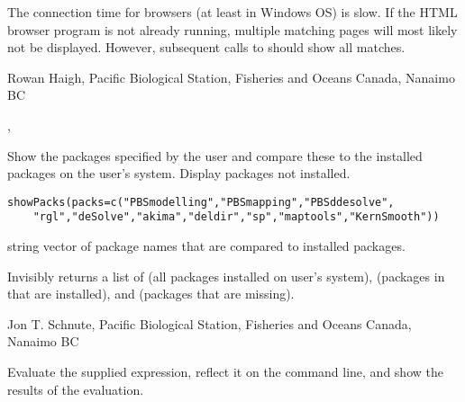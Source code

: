 \documentclass[letterpaper]{book}
\begin{document}
%
\begin{Note}\relax
The connection time for browsers (at least in Windows OS)
is slow. If the HTML browser program is not already running,
multiple matching pages will most likely not be displayed. However, 
subsequent calls to  should show all matches.
\end{Note}
%
\begin{Author}\relax
Rowan Haigh, Pacific Biological Station, Fisheries and Oceans Canada, Nanaimo BC
\end{Author}
%
\begin{SeeAlso}\relax
 
, 
\end{SeeAlso}
%
\begin{Description}\relax
Show the packages specified by the user and compare these to the 
installed packages on the user's system. Display packages not installed.
\end{Description}
%
\begin{Usage}
\begin{verbatim}
showPacks(packs=c("PBSmodelling","PBSmapping","PBSddesolve",
    "rgl","deSolve","akima","deldir","sp","maptools","KernSmooth"))
\end{verbatim}
\end{Usage}
%
\begin{Arguments}
\begin{ldescription}
\item[\code{packs}]  string vector of package names that are compared to installed packages. 
\end{ldescription}
\end{Arguments}
%
\begin{Value}
Invisibly returns a list of  (all packages installed on user's system),
 (packages in  that are installed), and
 (packages that are missing).
\end{Value}
%
\begin{Author}\relax
Jon T. Schnute, Pacific Biological Station, Fisheries and Oceans Canada, Nanaimo BC
\end{Author}
%
\begin{Description}\relax
Evaluate the supplied expression, reflect it on the command line, 
and show the results of the evaluation.
\end{Description}
\end{document}
